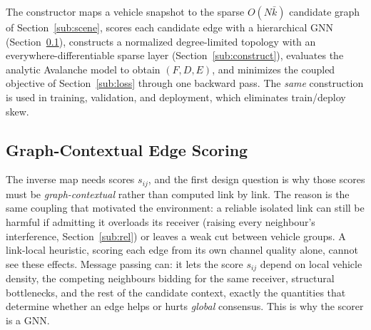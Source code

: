 \documentclass[journal]{IEEEtran}
\newcommand{\kcand}{\ensuremath{\bar k}}                 %
\begin{document}
The constructor maps a vehicle snapshot to the sparse $O(N\kcand)$ candidate
graph of Section~\ref{sub:scene}, scores each candidate edge with a hierarchical
GNN (Section~\ref{sub:scorer}), constructs a normalized degree-limited topology
with an everywhere-differentiable sparse layer (Section~\ref{sub:construct}),
evaluates the analytic Avalanche model to obtain $(F,D,E)$, and minimizes the
coupled objective of Section~\ref{sub:loss} through one backward pass. The
\emph{same} construction is used in training, validation, and deployment, which
eliminates train/deploy skew.

\subsection{Graph-Contextual Edge Scoring}\label{sub:scorer}

The inverse map needs scores $s_{ij}$, and the first design question is why those
scores must be \emph{graph-contextual} rather than computed link by link. The
reason is the same coupling that motivated the environment: a reliable isolated
link can still be harmful if admitting it overloads its receiver (raising every
neighbour's interference, Section~\ref{sub:rel}) or leaves a weak cut between
vehicle groups. A link-local heuristic, scoring each edge from its own channel
quality alone, cannot see these effects. Message passing can: it lets the score
$s_{ij}$ depend on local vehicle density, the competing neighbours bidding for
the same receiver, structural bottlenecks, and the rest of the candidate context,
exactly the quantities that determine whether an edge helps or hurts \emph{global}
consensus. This is why the scorer is a GNN.
\end{document}
